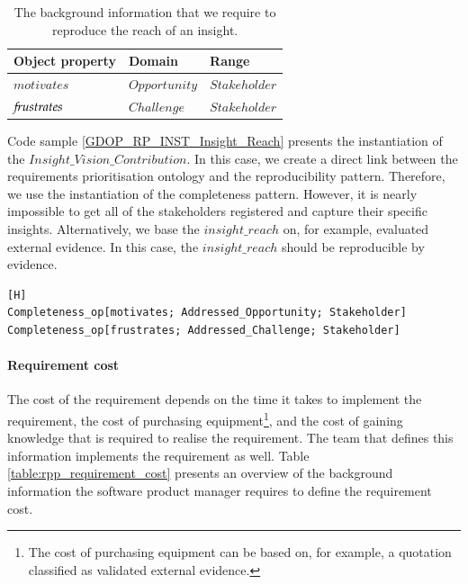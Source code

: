 \begin{table}[H]
\centering
\caption{The background information that we require to reproduce the reach of an insight.}
\begin{tabular}{| p{5cm} | p{2cm} | p{8cm} | }
\hline
\rowcolor{document}
\color{documentText}Object property & \color{documentText}Domain & \color{documentText}Range  \\
\hline
$motivates$ & $Opportunity$ & $Stakeholder$ \\ 
\hdashline
${\mkern-2mu f\mkern-3mu}rustrates$ & $Challenge$ & $Stakeholder$ \\ 
\hline
\end{tabular}
\label{table:rpp_insight_reach}
\end{table}

Code sample \ref{GDOP_RP_INST_Insight_Reach} presents the instantiation of the $Insight\_Vision\_Contribution$. In this case, we create a direct link between the requirements prioritisation ontology and the reproducibility pattern. Therefore, we use the instantiation of the completeness pattern. However, it is nearly impossible to get all of the stakeholders registered and capture their specific insights. Alternatively, we base the $insight\_reach$ on, for example, evaluated external evidence. In this case, the $insight\_reach$ should be reproducible by evidence. 

\begin{lstlisting}[float,language=GDOL,caption={The instantiation of the completeness pattern that contributes to the reproducibility of the $insight\_value$.},label={GDOP_RP_INST_Insight_Reach}][H]
Completeness_op[motivates; Addressed_Opportunity; Stakeholder] 
Completeness_op[frustrates; Addressed_Challenge; Stakeholder] 
\end{lstlisting}

\paragraph{Requirement cost}
The cost of the requirement depends on the time it takes to implement the requirement, the cost of purchasing equipment\footnote{The cost of purchasing equipment can be based on, for example, a quotation classified as validated external evidence.}, and the cost of gaining knowledge that is required to realise the requirement. The team that defines this information implements the requirement as well. Table \ref{table:rpp_requirement_cost} presents an overview of the background information the software product manager requires to define the requirement cost.

